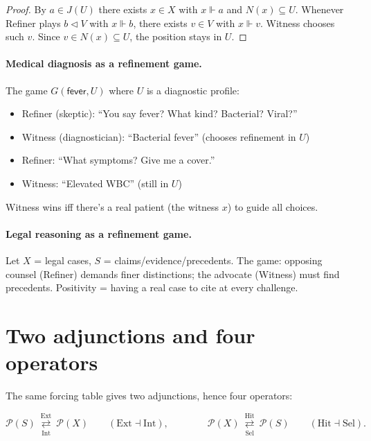 \documentclass[11pt]{article}
\theoremstyle{definition}
\theoremstyle{plain}
\newcommand{\Pow}{\mathcal P}
\newcommand{\Ext}{\mathrm{Ext}}
\newcommand{\Intt}{\mathrm{Int}}
\newcommand{\Hit}{\mathrm{Hit}}
\newcommand{\Sel}{\mathrm{Sel}}
\newcommand{\forces}{\Vdash}
\newcommand{\covers}{\triangleleft}
\begin{document}
\begin{proof}
By $a\in J(U)$ there exists $x\in X$ with $x\forces a$ and $N(x)\subseteq U$.
Whenever Refiner plays $b\covers V$ with $x\forces b$, there exists $v\in V$ with $x\forces v$.
Witness chooses such $v$. Since $v\in N(x)\subseteq U$, the position stays in $U$.
\end{proof}

\paragraph{Medical diagnosis as a refinement game.}
The game $G(\mathsf{fever}, U)$ where $U$ is a diagnostic profile:
\begin{itemize}
  \item Refiner (skeptic): ``You say fever? What kind? Bacterial? Viral?''
  \item Witness (diagnostician): ``Bacterial fever'' (chooses refinement in $U$)
  \item Refiner: ``What symptoms? Give me a cover.''
  \item Witness: ``Elevated WBC'' (still in $U$)
\end{itemize}
Witness wins iff there's a real patient (the witness $x$) to guide all choices.

\paragraph{Legal reasoning as a refinement game.}
Let $X$ = legal cases, $S$ = claims/evidence/precedents.
The game: opposing counsel (Refiner) demands finer distinctions; the advocate (Witness) must find precedents.
Positivity = having a real case to cite at every challenge.

\section{Two adjunctions and four operators}\label{sec:two-adjunctions}

The same forcing table gives two adjunctions, hence four operators:

\[
\Pow(S)\ \underset{\Intt}{\overset{\Ext}{\rightleftarrows}}\ \Pow(X)
\qquad(\Ext\dashv \Intt),
\qquad\qquad
\Pow(X)\ \underset{\Sel}{\overset{\Hit}{\rightleftarrows}}\ \Pow(S)
\qquad(\Hit\dashv \Sel).
\]
\end{document}
